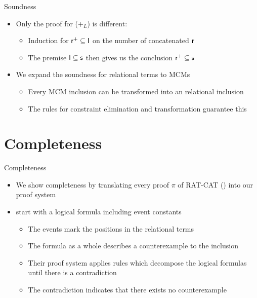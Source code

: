 \documentclass[t,english,aspectratio=169,11pt]{beamer}
\begin{document}
\begin{frame}{Soundness}
\begin{itemize}[<+->]
	\item Only the proof for ($+_L$) is different:
	\begin{itemize}
		\item Induction for $\textsf{\upshape r}^+ \subseteq \textsf{\upshape I}$ on the number of concatenated $\textsf{\upshape r}$
		\item The premise $\textsf{\upshape I} \subseteq \textsf{\upshape s}$ then gives us the conclusion $\textsf{\upshape r}^+ \subseteq \textsf{\upshape s}$
	\end{itemize}
	\item We expand the soundness for relational terms to MCMs
	\begin{itemize}
		\item Every MCM inclusion can be transformed into an relational inclusion
		\item The rules for constraint elimination and transformation guarantee this
	\end{itemize}
\end{itemize}
\end{frame}

\section{Completeness}
\begin{frame}{Completeness}
\begin{itemize}[<+->]
	\item We show completeness by translating every proof $\pi$ of RAT-CAT (\cite{Gru+26}) into our proof system
	\item \cite{Gru+26} start with a logical formula including event constants
	\begin{itemize}
		\item The events mark the positions in the relational terms
		\item The formula as a whole describes a counterexample to the inclusion
		\item Their proof system applies rules which decompose the logical formulas until there is a contradiction
		\item The contradiction indicates that there exists no counterexample
	\end{itemize}
\end{itemize}
\end{frame}
\end{document}
